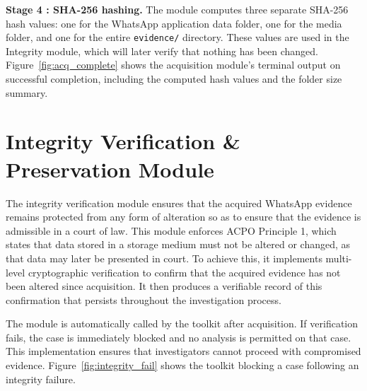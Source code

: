 \documentclass[12pt,a4paper]{report}
\begin{document}
\textbf{Stage 4 : SHA-256 hashing.} The module computes three separate SHA-256 hash values: one for the WhatsApp application data folder, one for the media folder, and one for the entire \texttt{evidence/} directory. These values are used in the Integrity module, which will later verify that nothing has been changed. Figure~\ref{fig:acq_complete} shows the acquisition module's terminal output on successful completion, including the computed hash values and the folder size summary.


\section{Integrity Verification \& Preservation Module}

The integrity verification module ensures that the acquired WhatsApp evidence remains protected from any form of alteration so as to ensure that the evidence is admissible in a court of law. This module enforces ACPO Principle 1, which states that data stored in a storage medium must not be altered or changed, as that data may later be presented in court. To achieve this, it implements multi-level cryptographic verification to confirm that the acquired evidence has not been altered since acquisition. It then produces a verifiable record of this confirmation that persists throughout the investigation process.

The module is automatically called by the toolkit after acquisition. If verification fails, the case is immediately blocked and no analysis is permitted on that case. This implementation ensures that investigators cannot proceed with compromised evidence. Figure~\ref{fig:integrity_fail} shows the toolkit blocking a case following an integrity failure.

\end{document}
